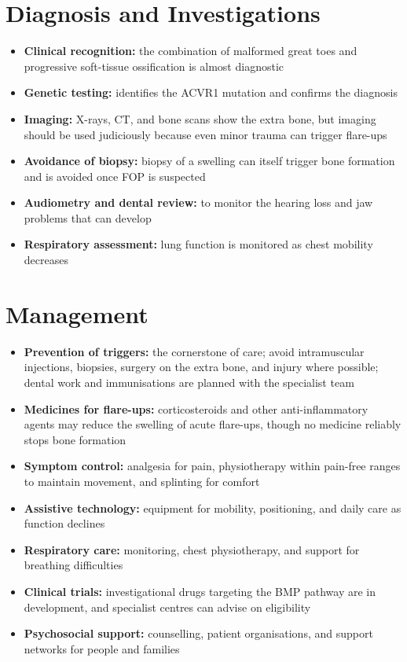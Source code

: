 \section*{Diagnosis and Investigations}
\begin{itemize}
    \item \textbf{Clinical recognition:} the combination of malformed great toes and progressive soft-tissue ossification is almost diagnostic
    \item \textbf{Genetic testing:} identifies the ACVR1 mutation and confirms the diagnosis
    \item \textbf{Imaging:} X-rays, CT, and bone scans show the extra bone, but imaging should be used judiciously because even minor trauma can trigger flare-ups
    \item \textbf{Avoidance of biopsy:} biopsy of a swelling can itself trigger bone formation and is avoided once FOP is suspected
    \item \textbf{Audiometry and dental review:} to monitor the hearing loss and jaw problems that can develop
    \item \textbf{Respiratory assessment:} lung function is monitored as chest mobility decreases
\end{itemize}

\section*{Management}
\begin{itemize}
    \item \textbf{Prevention of triggers:} the cornerstone of care; avoid intramuscular injections, biopsies, surgery on the extra bone, and injury where possible; dental work and immunisations are planned with the specialist team
    \item \textbf{Medicines for flare-ups:} corticosteroids and other anti-inflammatory agents may reduce the swelling of acute flare-ups, though no medicine reliably stops bone formation
    \item \textbf{Symptom control:} analgesia for pain, physiotherapy within pain-free ranges to maintain movement, and splinting for comfort
    \item \textbf{Assistive technology:} equipment for mobility, positioning, and daily care as function declines
    \item \textbf{Respiratory care:} monitoring, chest physiotherapy, and support for breathing difficulties
    \item \textbf{Clinical trials:} investigational drugs targeting the BMP pathway are in development, and specialist centres can advise on eligibility
    \item \textbf{Psychosocial support:} counselling, patient organisations, and support networks for people and families
\end{itemize}

